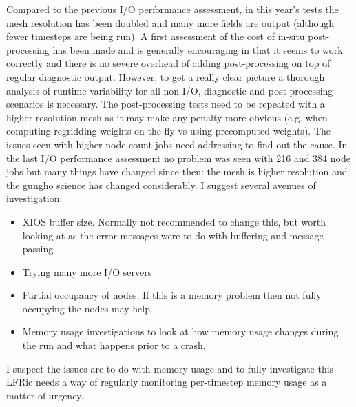 Compared to the previous I/O performance assessment, in this year's tests the mesh resolution has been doubled and many more fields are output (although fewer timesteps are being run). A first assessment of the cost of in-situ post-processing has been made and is generally encouraging in that it seems to work correctly and there is no severe overhead of adding post-processing on top of regular diagnostic output. However, to get a really clear picture a thorough analysis of runtime variability for all non-I/O, diagnostic and post-processing scenarios is necessary. The post-processing tests need to be repeated with a higher resolution mesh as it may make any penalty more obvious (e.g. when computing regridding weights on the fly vs using precomputed weights). The issues seen with higher node count jobs need addressing to find out the cause. In the last I/O performance assessment no problem was seen with 216 and 384 node jobs but many things have changed since then: the mesh is higher resolution and the gungho science has changed considerably. 
I suggest several avenues of investigation:

\begin{itemize}
  \item XIOS buffer size. Normally not recommended to change this, but worth looking at as the error messages were to do with buffering and message passing
  \item Trying many more I/O servers
  \item Partial occupancy of nodes. If this is a memory problem then not fully occupying the nodes may help.
  \item Memory usage investigations to look at how memory usage changes during the run and what happens prior to a crash.
\end{itemize}


I suspect the issues are to do with memory usage and to fully investigate this LFRic needs a way of regularly monitoring per-timestep memory usage as a matter of urgency.
 

